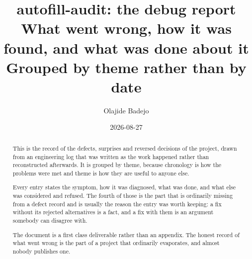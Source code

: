 \documentclass[11pt,a4paper,oneside]{report}
\title{%
  \Large\textbf{autofill-audit: the debug report}\\[.6em]
  \large What went wrong, how it was found, and what was done about it\\[.4em]
  \normalsize Grouped by theme rather than by date
}
\author{Olajide Badejo}
\date{2026-08-27}
\begin{document}
\maketitle

\begin{abstract}
\noindent
This is the record of the defects, surprises and reversed decisions of the
project, drawn from an engineering log that was written as the work happened
rather than reconstructed afterwards. It is grouped by theme, because
chronology is how the problems were met and theme is how they are useful to
anyone else.

Every entry states the symptom, how it was diagnosed, what was done, and what
else was considered and refused. The fourth of those is the part that is
ordinarily missing from a defect record and is usually the reason the entry was
worth keeping: a fix without its rejected alternatives is a fact, and a fix with
them is an argument somebody can disagree with.

The document is a first class deliverable rather than an appendix. The
honest record of what went wrong is the part of a project that ordinarily
evaporates, and almost nobody publishes one.
\end{abstract}

\tableofcontents












\end{document}
